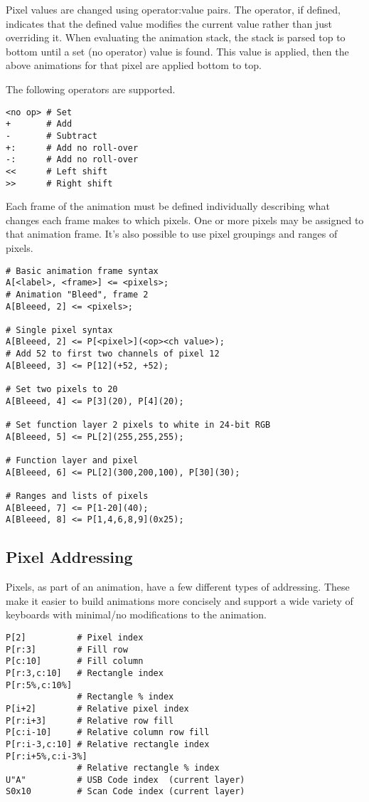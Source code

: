 \documentclass{kiibohd-template}
\begin{document}
Pixel values are changed using operator:value pairs.
The operator, if defined, indicates that the defined value modifies the current value rather than just overriding it.
When evaluating the animation stack, the stack is parsed top to bottom until a set (no operator) value is found.
This value is applied, then the above animations for that pixel are applied bottom to top.

The following operators are supported.

\begin{lstlisting}
<no op> # Set
+       # Add
-       # Subtract
+:      # Add no roll-over
-:      # Add no roll-over
<<      # Left shift
>>      # Right shift
\end{lstlisting}

Each frame of the animation must be defined individually describing what changes each frame makes to which pixels.
One or more pixels may be assigned to that animation frame.
It's also possible to use pixel groupings and ranges of pixels.

\begin{lstlisting}
# Basic animation frame syntax
A[<label>, <frame>] <= <pixels>;
# Animation "Bleed", frame 2
A[Bleeed, 2] <= <pixels>;

# Single pixel syntax
A[Bleeed, 2] <= P[<pixel>](<op><ch value>);
# Add 52 to first two channels of pixel 12
A[Bleeed, 3] <= P[12](+52, +52);

# Set two pixels to 20
A[Bleeed, 4] <= P[3](20), P[4](20);

# Set function layer 2 pixels to white in 24-bit RGB
A[Bleeed, 5] <= PL[2](255,255,255);

# Function layer and pixel
A[Bleeed, 6] <= PL[2](300,200,100), P[30](30);

# Ranges and lists of pixels
A[Bleeed, 7] <= P[1-20](40);
A[Bleeed, 8] <= P[1,4,6,8,9](0x25);
\end{lstlisting}


\subsection{Pixel Addressing}

Pixels, as part of an animation, have a few different types of addressing.
These make it easier to build animations more concisely and support a wide variety of keyboards with minimal/no modifications to the animation.

\begin{lstlisting}
P[2]          # Pixel index
P[r:3]        # Fill row
P[c:10]       # Fill column
P[r:3,c:10]   # Rectangle index
P[r:5%,c:10%]
              # Rectangle % index
P[i+2]        # Relative pixel index
P[r:i+3]      # Relative row fill
P[c:i-10]     # Relative column row fill
P[r:i-3,c:10] # Relative rectangle index
P[r:i+5%,c:i-3%]
              # Relative rectangle % index
U"A"          # USB Code index  (current layer)
S0x10         # Scan Code index (current layer)
\end{lstlisting}
\end{document}
